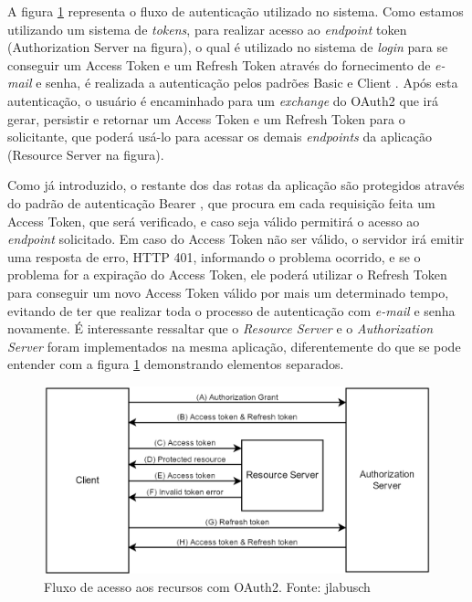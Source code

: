 A figura \ref{fig:oauth2} representa o fluxo de autenticação utilizado no sistema. Como estamos utilizando um sistema de \textit{tokens}, para realizar acesso ao \textit{endpoint} token (Authorization Server na figura), o qual é utilizado no sistema de \textit{login} para se conseguir um Access Token e um Refresh Token através do fornecimento de \textit{e-mail} e senha, é realizada a autenticação pelos padrões Basic \cite{passport-basic} e Client \cite{passport-client}. Após esta autenticação, o usuário é encaminhado para um \textit{exchange} do OAuth2 que irá gerar, persistir e retornar um Access Token e um Refresh Token para o solicitante, que poderá usá-lo para acessar os demais \textit{endpoints} da aplicação (Resource Server na figura).

Como já introduzido, o restante dos das rotas da aplicação são protegidos através do padrão de autenticação Bearer \cite{passport-bearer}, que procura em cada requisição feita um Access Token, que será verificado, e caso seja válido permitirá o acesso ao \textit{endpoint} solicitado. Em caso do Access Token não ser válido, o servidor irá emitir uma resposta de erro, HTTP 401, informando o problema ocorrido, e se o problema for a expiração do Access Token, ele poderá utilizar o Refresh Token para conseguir um novo Access Token válido por mais um determinado tempo, evitando de ter que realizar toda o processo de autenticação com \textit{e-mail} e senha novamente. É interessante ressaltar que o \textit{Resource Server} e o \textit{Authorization Server} foram implementados na mesma aplicação, diferentemente do que se pode entender com a figura \ref{fig:oauth2} demonstrando elementos separados.

\begin{figure}[H]
	\centering
	\includegraphics[scale=0.49]{imagens/oauth2.png}
	\caption{\small Fluxo de acesso aos recursos com OAuth2. Fonte: jlabusch \cite{img-jlabusch}}
	\label{fig:oauth2}
\end{figure}

